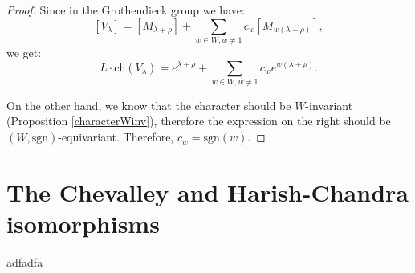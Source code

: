 \begin{proof}
 Since in the Grothendieck group we have: $$[V_\lambda]= [M_{\lambda+\rho}] + \sum_{w\in W, w\ne 1} c_w [M_{w(\lambda+\rho)}],$$
we get:
$$ L\cdot \text{ch}(V_\lambda) = e^{\lambda+\rho} + \sum_{w\in W,w\ne 1} c_w e^{w(\lambda+\rho)}.$$

On the other hand, we know that the character should be $W$-invariant (Proposition \ref{characterWinv}), therefore the expression on the right should be $(W,\text{sgn})$-equivariant. Therefore, $c_w = \text{sgn}(w)$.
\end{proof}




\section{The Chevalley and Harish-Chandra isomorphisms}

adfadfa










